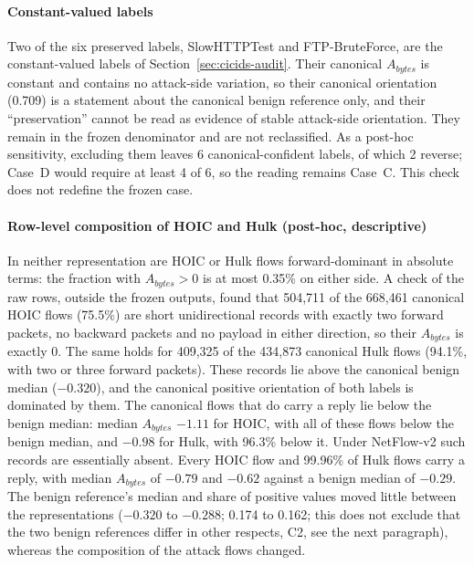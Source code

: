 \documentclass[preprint,12pt]{elsarticle}
\begin{document}
\paragraph{Constant-valued labels} Two of the six preserved labels, SlowHTTPTest and FTP-BruteForce, are the constant-valued labels of Section~\ref{sec:cicids-audit}. Their canonical $A_{bytes}$ is constant and contains no attack-side variation, so their canonical orientation (0.709) is a statement about the canonical benign reference only, and their ``preservation'' cannot be read as evidence of stable attack-side orientation. They remain in the frozen denominator and are not reclassified. As a post-hoc sensitivity, excluding them leaves 6 canonical-confident labels, of which 2 reverse; Case~D would require at least 4 of 6, so the reading remains Case~C. This check does not redefine the frozen case.

\paragraph{Row-level composition of HOIC and Hulk (post-hoc, descriptive)} In neither representation are HOIC or Hulk flows forward-dominant in absolute terms: the fraction with $A_{bytes}>0$ is at most 0.35\% on either side. A check of the raw rows, outside the frozen outputs, found that 504{,}711 of the 668{,}461 canonical HOIC flows (75.5\%) are short unidirectional records with exactly two forward packets, no backward packets and no payload in either direction, so their $A_{bytes}$ is exactly 0. The same holds for 409{,}325 of the 434{,}873 canonical Hulk flows (94.1\%, with two or three forward packets). These records lie above the canonical benign median ($-0.320$), and the canonical positive orientation of both labels is dominated by them. The canonical flows that do carry a reply lie below the benign median: median $A_{bytes}$ $-1.11$ for HOIC, with all of these flows below the benign median, and $-0.98$ for Hulk, with 96.3\% below it. Under NetFlow-v2 such records are essentially absent. Every HOIC flow and 99.96\% of Hulk flows carry a reply, with median $A_{bytes}$ of $-0.79$ and $-0.62$ against a benign median of $-0.29$. The benign reference's median and share of positive values moved little between the representations ($-0.320$ to $-0.288$; 0.174 to 0.162; this does not exclude that the two benign references differ in other respects, C2, see the next paragraph), whereas the composition of the attack flows changed.
\end{document}
